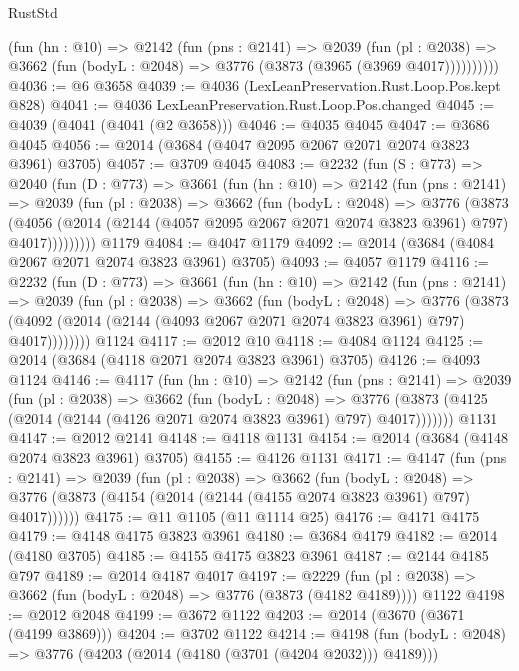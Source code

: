 \begin{lexlean}{RustStd}
\begin{coremodule}
          (fun (hn : @10) =>
          @2142
            (fun (pns : @2141) =>
            @2039
              (fun (pl : @2038) =>
              @3662 (fun (bodyL : @2048) => @3776 (@3873 (@3965 (@3969 @4017))))))))))
@4036 := @6 @3658
@4039 := @4036 (LexLeanPreservation.Rust.Loop.Pos.kept @828)
@4041 := @4036 LexLeanPreservation.Rust.Loop.Pos.changed
@4045 := @4039 (@4041 (@4041 (@2 @3658)))
@4046 := @4035 @4045
@4047 := @3686 @4045
@4056 := @2014 (@3684 (@4047 @2095 @2067 @2071 @2074 @3823 @3961) @3705)
@4057 := @3709 @4045
@4083 := @2232
    (fun (S : @773) =>
    @2040
      (fun (D : @773) =>
      @3661
        (fun (hn : @10) =>
        @2142
          (fun (pns : @2141) =>
          @2039
            (fun (pl : @2038) =>
            @3662
              (fun (bodyL : @2048) =>
              @3776
                (@3873
                  (@4056
                    (@2014 (@2144 (@4057 @2095 @2067 @2071 @2074 @3823 @3961) @797) @4017)))))))))
    @1179
@4084 := @4047 @1179
@4092 := @2014 (@3684 (@4084 @2067 @2071 @2074 @3823 @3961) @3705)
@4093 := @4057 @1179
@4116 := @2232
    (fun (D : @773) =>
    @3661
      (fun (hn : @10) =>
      @2142
        (fun (pns : @2141) =>
        @2039
          (fun (pl : @2038) =>
          @3662
            (fun (bodyL : @2048) =>
            @3776
              (@3873 (@4092 (@2014 (@2144 (@4093 @2067 @2071 @2074 @3823 @3961) @797) @4017))))))))
    @1124
@4117 := @2012 @10
@4118 := @4084 @1124
@4125 := @2014 (@3684 (@4118 @2071 @2074 @3823 @3961) @3705)
@4126 := @4093 @1124
@4146 := @4117
    (fun (hn : @10) =>
    @2142
      (fun (pns : @2141) =>
      @2039
        (fun (pl : @2038) =>
        @3662
          (fun (bodyL : @2048) =>
          @3776 (@3873 (@4125 (@2014 (@2144 (@4126 @2071 @2074 @3823 @3961) @797) @4017)))))))
    @1131
@4147 := @2012 @2141
@4148 := @4118 @1131
@4154 := @2014 (@3684 (@4148 @2074 @3823 @3961) @3705)
@4155 := @4126 @1131
@4171 := @4147
    (fun (pns : @2141) =>
    @2039
      (fun (pl : @2038) =>
      @3662
        (fun (bodyL : @2048) =>
        @3776 (@3873 (@4154 (@2014 (@2144 (@4155 @2074 @3823 @3961) @797) @4017))))))
@4175 := @11 @1105 (@11 @1114 @25)
@4176 := @4171 @4175
@4179 := @4148 @4175 @3823 @3961
@4180 := @3684 @4179
@4182 := @2014 (@4180 @3705)
@4185 := @4155 @4175 @3823 @3961
@4187 := @2144 @4185 @797
@4189 := @2014 @4187 @4017
@4197 := @2229
    (fun (pl : @2038) => @3662 (fun (bodyL : @2048) => @3776 (@3873 (@4182 @4189))))
    @1122
@4198 := @2012 @2048
@4199 := @3672 @1122
@4203 := @2014 (@3670 (@3671 (@4199 @3869)))
@4204 := @3702 @1122
@4214 := @4198
    (fun (bodyL : @2048) => @3776 (@4203 (@2014 (@4180 (@3701 (@4204 @2032))) @4189)))

\end{coremodule}
\end{lexlean}
